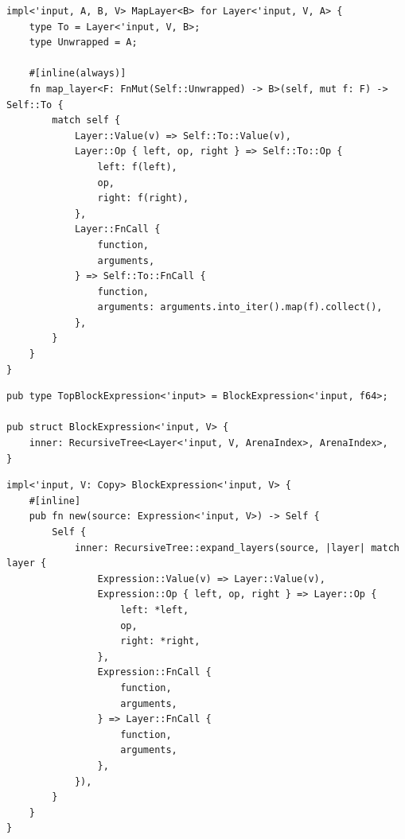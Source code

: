 \begin{frame}[fragile]
    \begin{verbatim}
impl<'input, A, B, V> MapLayer<B> for Layer<'input, V, A> {
    type To = Layer<'input, V, B>;
    type Unwrapped = A;

    #[inline(always)]
    fn map_layer<F: FnMut(Self::Unwrapped) -> B>(self, mut f: F) -> Self::To {
        match self {
            Layer::Value(v) => Self::To::Value(v),
            Layer::Op { left, op, right } => Self::To::Op {
                left: f(left),
                op,
                right: f(right),
            },
            Layer::FnCall {
                function,
                arguments,
            } => Self::To::FnCall {
                function,
                arguments: arguments.into_iter().map(f).collect(),
            },
        }
    }
}
    \end{verbatim}
\end{frame}

\begin{frame}[fragile]
    \begin{verbatim}
pub type TopBlockExpression<'input> = BlockExpression<'input, f64>;

pub struct BlockExpression<'input, V> {
    inner: RecursiveTree<Layer<'input, V, ArenaIndex>, ArenaIndex>,
}
    \end{verbatim}
\end{frame}

\begin{frame}[fragile]
    \begin{verbatim}
impl<'input, V: Copy> BlockExpression<'input, V> {
    #[inline]
    pub fn new(source: Expression<'input, V>) -> Self {
        Self {
            inner: RecursiveTree::expand_layers(source, |layer| match layer {
                Expression::Value(v) => Layer::Value(v),
                Expression::Op { left, op, right } => Layer::Op {
                    left: *left,
                    op,
                    right: *right,
                },
                Expression::FnCall {
                    function,
                    arguments,
                } => Layer::FnCall {
                    function,
                    arguments,
                },
            }),
        }
    }
}
    \end{verbatim}
\end{frame}

